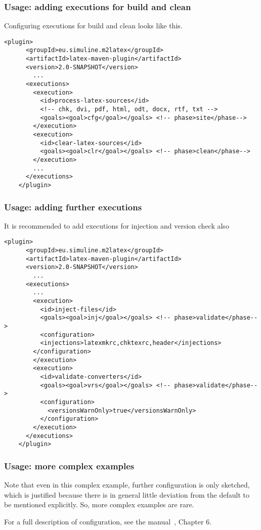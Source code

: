 \begin{frame}[fragile]
  \frametitle{Usage: adding executions for build and clean}
  Configuring executions for build and clean looks like this. 

\begin{Verbatim}[fontsize=\scriptsize]
    <plugin>
      <groupId>eu.simuline.m2latex</groupId>
      <artifactId>latex-maven-plugin</artifactId>
      <version>2.0-SNAPSHOT</version>
        ...
      <executions>
        <execution>
          <id>process-latex-sources</id>
          <!-- chk, dvi, pdf, html, odt, docx, rtf, txt -->
          <goals><goal>cfg</goal></goals> <!-- phase>site</phase-->
        </execution>
        <execution>
          <id>clear-latex-sources</id>
          <goals><goal>clr</goal></goals> <!-- phase>clean</phase-->
        </execution>
        ...
      </executions>
    </plugin>
\end{Verbatim}

\end{frame}

\begin{frame}[fragile]
  \frametitle{Usage: adding further executions }
  It is recommended to add executions for injection and version check also 

\begin{Verbatim}[fontsize=\scriptsize]
    <plugin>
      <groupId>eu.simuline.m2latex</groupId>
      <artifactId>latex-maven-plugin</artifactId>
      <version>2.0-SNAPSHOT</version>
        ...
      <executions>
        ...
        <execution>
          <id>inject-files</id>
          <goals><goal>inj</goal></goals> <!-- phase>validate</phase-->
          <configuration>
          <injections>latexmkrc,chktexrc,header</injections>
        </configuration>
        </execution>
        <execution>
          <id>validate-converters</id>
          <goals><goal>vrs</goal></goals> <!-- phase>validate</phase-->
          <configuration>
            <versionsWarnOnly>true</versionsWarnOnly>
          </configuration>
        </execution>
      </executions>
    </plugin>
\end{Verbatim}

\end{frame}


\begin{frame}[fragile]
  \frametitle{Usage: more complex examples}
  Note that even in this complex example, 
  further configuration is only sketched, 
  which is justified because 
  there is in general little deviation from the default 
  to be mentioned explicitly. 
  So, more complex examples are rare. 

  For a full description of configuration, 
see the manual~\cite{LatexPlugin}, Chapter 6. 
\end{frame}

